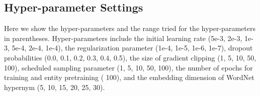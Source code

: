 \documentclass[11pt]{article}
\begin{document}
\subsection{Hyper-parameter Settings}

Here we show the hyper-parameters and the range tried for the hyper-parameters in parentheses. 
Hyper-parameters include the initial learning rate (5e-3, 2e-3, 1e-3, 5e-4,
2e-4, 1e-4), the regularization parameter (1e-4, 1e-5, 1e-6, 1e-7), dropout
probabilities (0.0, 0.1, 0.2, 0.3, 0.4, 0.5), the size of gradient clipping (1,
5, 10, 50, 100), scheduled sampling parameter  (1, 5, 10, 50, 100), the number of
epochs for training and entity pretraining ( 100), and the embedding dimension of WordNet hypernym (5, 10, 15, 20, 25, 30). 
\end{document}

